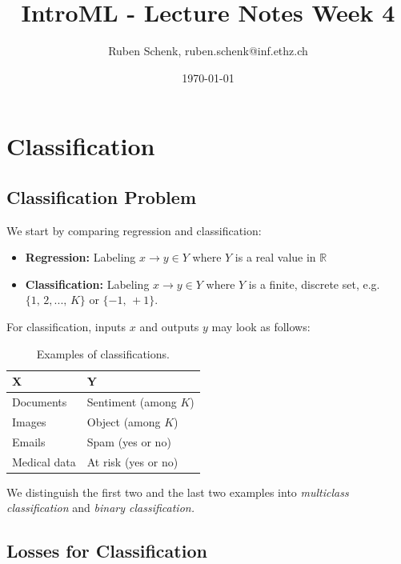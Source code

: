 \documentclass[a4paper]{extarticle}
\title{IntroML - Lecture Notes Week 4}
\author{Ruben Schenk, ruben.schenk@inf.ethz.ch}
\date{\today}
\begin{document}
\maketitle

\section{Classification}

\subsection{Classification Problem}

We start by comparing regression and classification:

\begin{itemize}
    \item \textbf{Regression:} Labeling \(x \to y \in Y\) where \(Y\) is a real value in \(\mathbb{R}\)
    \item \textbf{Classification:} Labeling \(x \to y \in Y\) where \(Y\) is a finite, discrete set, e.g. \(\{1, \, 2,..., \, K\}\) or \(\{-1, \, +1\}\).
\end{itemize}

For classification, inputs \(x\) and outputs \(y\) may look as follows:

\begin{table}[H]
    \centering
    \begin{tabular}{|l|l|}
        \hline
        \textbf{X}   & \textbf{Y}            \\ \hline
        Documents    & Sentiment (among $K$) \\ \hline
        Images       & Object (among $K$)    \\ \hline
        Emails       & Spam (yes or no)      \\ \hline
        Medical data & At risk (yes or no)   \\ \hline
    \end{tabular}
    \caption{Examples of classifications.}
    \label{tab:tb0401-classification}
    \end{table}

We distinguish the first two and the last two examples into \textit{multiclass classification} and \textit{binary classification.}

\subsection{Losses for Classification}
\end{document}
